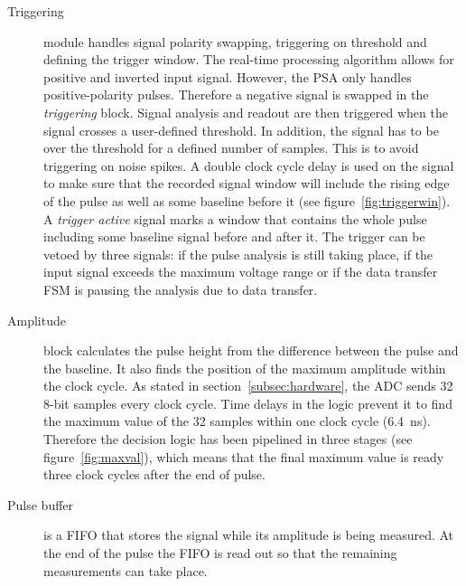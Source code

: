 \documentclass[12pt]{mytustyle}  %
\begin{document}
\begin{description}
\item[Triggering] module handles signal polarity swapping, triggering on threshold and defining the trigger window. The real-time processing algorithm allows for positive and inverted input signal. However, the PSA only handles positive-polarity pulses. Therefore a negative signal is swapped in the \textit{triggering} block. Signal analysis and readout are then triggered when the signal crosses a user-defined threshold. In addition, the signal has to be over the threshold for a defined number of samples. This is to avoid triggering on noise spikes.
A double clock cycle delay is used on the signal to make sure that the recorded signal window will include the rising edge of the pulse as well as some baseline before it (see figure~\ref{fig:triggerwin}). A \textit{trigger active} signal marks a window that contains the whole pulse including some baseline signal before and after it. 
The trigger can be vetoed by three signals: if the pulse analysis is still taking place, if the input signal exceeds the maximum voltage range or if the data transfer FSM is pausing the analysis due to data transfer.

%


\item[Amplitude] block calculates the pulse height from the difference between the pulse and the baseline. It also finds the position of the maximum amplitude within the clock cycle. As stated in section~\ref{subsec:hardware}, the ADC sends 32 8-bit samples every clock cycle. Time delays in the logic prevent it to find the maximum value of the 32 samples within one clock cycle (6.4~ns). Therefore the decision logic has been pipelined in three stages (see figure~\ref{fig:maxval}), which means that the final maximum value is ready three clock cycles after the end of pulse.
\item[Pulse buffer] is a FIFO that stores the signal while its amplitude is being measured. At the end of the pulse the FIFO is read out so that the remaining measurements can take place. 


\end{description}
\end{document}
